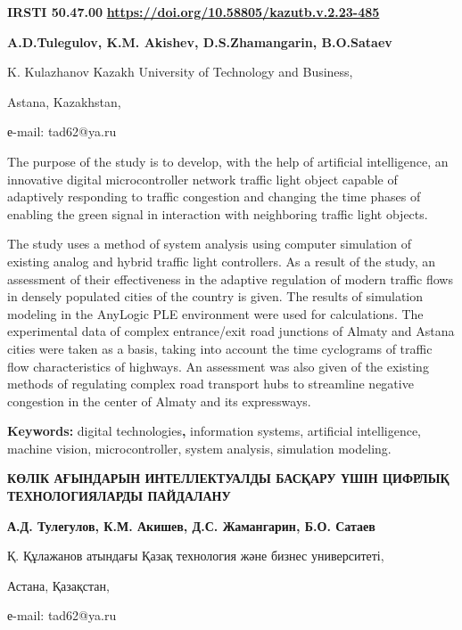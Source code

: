 \newpage
{\bfseries IRSTI 50.47.00}
\hfill {\bfseries \href{https://doi.org/10.58805/kazutb.v.2.23-485}{https://doi.org/10.58805/kazutb.v.2.23-485}}


\begin{center}
{\bfseries A.D.Tulegulov, K.M. Akishev, D.S.Zhamangarin, B.O.Sataev}

K. Kulazhanov Kazakh University of Technology and Business,

Astana, Kazakhstan,

е-mail: tad62@ya.ru
\end{center}

The purpose of the study is to develop, with the help of artificial
intelligence, an innovative digital microcontroller network traffic
light object capable of adaptively responding to traffic congestion and
changing the time phases of enabling the green signal in interaction
with neighboring traffic light objects.

The study uses a method of system analysis using computer simulation of
existing analog and hybrid traffic light controllers. As a result of the
study, an assessment of their effectiveness in the adaptive regulation
of modern traffic flows in densely populated cities of the country is
given. The results of simulation modeling in the AnyLogic PLE
environment were used for calculations. The experimental data of complex
entrance/exit road junctions of Almaty and Astana cities were taken as a
basis, taking into account the time cyclograms of traffic flow
characteristics of highways. An assessment was also given of the
existing methods of regulating complex road transport hubs to streamline
negative congestion in the center of Almaty and its expressways.

{\bfseries Keywords:} digital technologies{\bfseries ,} information systems,
artificial intelligence, machine vision, microcontroller, system
analysis, simulation modeling.

\begin{center}
{\large\bfseries КӨЛІК АҒЫНДАРЫН ИНТЕЛЛЕКТУАЛДЫ БАСҚАРУ ҮШІН ЦИФРЛЫҚ
ТЕХНОЛОГИЯЛАРДЫ ПАЙДАЛАНУ}

{\bfseries А.Д. Тулегулов, К.М. Акишев, Д.С. Жамангарин, Б.О. Сатаев}

Қ. Құлажанов атындағы Қазақ технология және бизнес университеті,

Астана, Қазақстан,

е-mail: tad62@ya.ru
\end{center}

